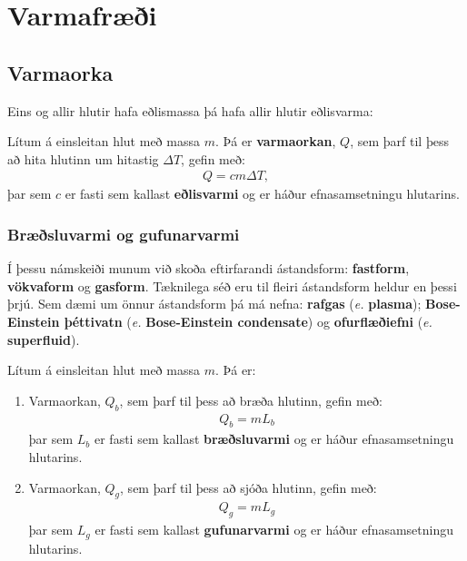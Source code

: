 \ifdefined \wholebook \else\documentclass[oneside]{book}\usepackage{EdlBook}\graphicspath{{figures/}}
\begin{document}
%
\setcounter{chapter}{12} %
%
\fi

\renewcommand{\thefigure}{\arabic{figure}}

\chapter{Varmafræði}

\section{Varmaorka}

Eins og allir hlutir hafa eðlismassa þá hafa allir hlutir eðlisvarma:

\begin{tcolorbox}
\begin{definition}
Lítum á einsleitan hlut með massa $m$. Þá er \textbf{varmaorkan}, $Q$, sem þarf til þess að hita hlutinn um hitastig $\Delta T$, gefin með:
\begin{align*}
    Q = cm\Delta T,
\end{align*}
þar sem $c$ er fasti sem kallast \textbf{eðlisvarmi} og er háður efnasamsetningu hlutarins.
\end{definition}
\end{tcolorbox}

\subsection{Bræðsluvarmi og gufunarvarmi}

Í þessu námskeiði munum við skoða eftirfarandi ástandsform: \textbf{fastform}, \textbf{vökvaform} og \textbf{gasform}. Tæknilega séð eru til fleiri ástandsform heldur en þessi þrjú. Sem dæmi um önnur ástandsform þá má nefna: \textbf{rafgas} (\emph{e.} \textbf{plasma}); \textbf{Bose-Einstein þéttivatn} (\emph{e.} \textbf{Bose-Einstein condensate}) og \textbf{ofurflæðiefni} (\emph{e.} \textbf{superfluid}).

\begin{tcolorbox}
\begin{definition}
Lítum á einsleitan hlut með massa $m$. Þá er:
\begin{enumerate}[label = \textbf{(\roman*)}]
    \item Varmaorkan, $Q_b$,  sem þarf til þess að bræða hlutinn, gefin með:
\begin{align*}
    Q_b = mL_b
\end{align*}
þar sem $L_b$ er fasti sem kallast \textbf{bræðsluvarmi} og er háður efnasamsetningu hlutarins.
    \item Varmaorkan, $Q_g$,  sem þarf til þess að sjóða hlutinn, gefin með:
\begin{align*}
    Q_g = mL_g
\end{align*}
þar sem $L_g$ er fasti sem kallast \textbf{gufunarvarmi} og er háður efnasamsetningu hlutarins.
\end{enumerate}

\end{definition}
\end{tcolorbox}
\end{document}
